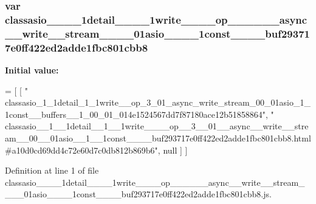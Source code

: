 \subsubsection[{classasio\+\_\+\+\_\+1\+\_\+\+\_\+1detail\+\_\+\+\_\+1\+\_\+\+\_\+1write\+\_\+\+\_\+\+\_\+\+\_\+op\+\_\+\+\_\+3\+\_\+\+\_\+01\+\_\+\+\_\+async\+\_\+\+\_\+write\+\_\+\+\_\+stream\+\_\+\+\_\+00\+\_\+\+\_\+01asio\+\_\+\+\_\+1\+\_\+\+\_\+1const\+\_\+\+\_\+\+\_\+\+\_\+buf293717e0ff422ed2adde1fbc801cbb8}]{\setlength{\rightskip}{0pt plus 5cm}var classasio\+\_\+\+\_\+\_\+\+\_\+1detail\+\_\+\+\_\+\_\+\+\_\+1write\+\_\+\+\_\+\+\_\+\+\_\+op\+\_\+\+\_\+\_\+\+\_\+\_\+\+\_\+async\+\_\+\+\_\+write\+\_\+\+\_\+stream\+\_\+\+\_\+\_\+\+\_\+01asio\+\_\+\+\_\+\_\+\+\_\+1const\+\_\+\+\_\+\+\_\+\+\_\+buf293717e0ff422ed2adde1fbc801cbb8}\label{classasio____1____1detail____1____1write________op____3____01____async____write____stream____00_e60d84c6b0708b00b7ea328c79af6a4c_a093625b48f43c982ef9b65029969dedb}
{\bfseries Initial value\+:}
\begin{DoxyCode}
=
[
    [ \textcolor{stringliteral}{"
      classasio\_1\_1detail\_1\_1write\_\_op\_3\_01\_async\_write\_stream\_00\_01asio\_1\_1const\_\_buffers\_\_1\_00\_01\_014e1524567dd7f87180ace12b51858864"}, \textcolor{stringliteral}{"
      classasio\_\_1\_\_1detail\_\_1\_\_1write\_\_\_\_op\_\_3\_\_01\_\_async\_\_write\_\_stream\_\_00\_\_01asio\_\_1\_\_1const\_\_\_\_buf293717e0ff422ed2adde1fbc801cbb8.html#a10d0cd69dd4c72e60d7c0db812b869b6"}, null ]
]
\end{DoxyCode}


Definition at line 1 of file classasio\+\_\+\+\_\+\_\+\+\_\+1detail\+\_\+\+\_\+\_\+\+\_\+1write\+\_\+\+\_\+\+\_\+\+\_\+op\+\_\+\+\_\+\_\+\+\_\+\_\+\+\_\+async\+\_\+\+\_\+write\+\_\+\+\_\+stream\+\_\+\+\_\+\_\+\+\_\+01asio\+\_\+\+\_\+\_\+\+\_\+1const\+\_\+\+\_\+\+\_\+\+\_\+buf293717e0ff422ed2adde1fbc801cbb8.\+js.

